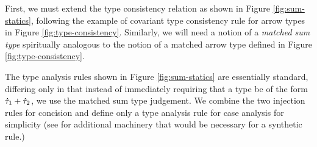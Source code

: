 First, we must extend the type consistency relation as shown in Figure \ref{fig:sum-statics}, following the example of covariant type consistency rule for arrow types in Figure \ref{fig:type-consistency}. Similarly, we will need a notion of a \emph{matched sum type} spiritually analogous to the notion of a matched arrow type defined in Figure \ref{fig:type-consistency}. 

The type analysis rules shown in Figure \ref{fig:sum-statics} are essentially standard, differing only in that instead of immediately requiring that a type be of the form $\dot{\tau}_1 + \dot{\tau}_2$, we use the matched sum type judgement. We combine the two injection rules for concision and define only a type analysis rule for case analysis for simplicity (see \cite{gradualizer} for additional machinery that would be necessary for a synthetic rule.)



%


